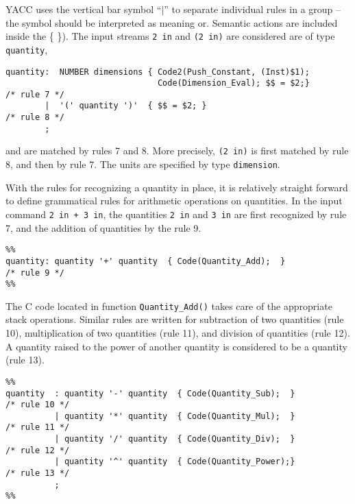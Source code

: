 \vspace{0.15 in}\noindent
YACC uses the vertical bar symbol ``$|$'' to
separate individual rules in a group -- the symbol
should be interpreted as meaning or.
Semantic actions are included inside the \{ \}).
The input streams {\tt 2 in} and {\tt (2 in)} are
considered are of type {\tt quantity},

\begin{footnotesize}
\begin{verbatim}
quantity:  NUMBER dimensions { Code2(Push_Constant, (Inst)$1);
                               Code(Dimension_Eval); $$ = $2;}        /* rule 7 */
        |  '(' quantity ')'  { $$ = $2; }                             /* rule 8 */
        ;
\end{verbatim}
\end{footnotesize}

\vspace{0.05 in}\noindent
and are matched by rules 7 and 8. More precisely, {\tt (2 in)} is
first matched by rule 8, and then by rule 7.
The units are specified by type {\tt dimension}.

\vspace{0.15 in}
\noindent\hspace{0.50 in}
With the rules for recognizing a quantity in place,
it is relatively straight forward to define grammatical
rules for arithmetic operations on quantities.
In the input command {\tt 2 in + 3 in},
the quantities {\tt 2 in} and {\tt 3 in} are first recognized by rule 7,
and the addition of quantities by the rule 9.

\begin{footnotesize}
\begin{verbatim}
%%
quantity: quantity '+' quantity  { Code(Quantity_Add);  }             /* rule 9 */
%%
\end{verbatim}
\end{footnotesize}

\vspace{0.15 in}\noindent
The C code located in function {\tt Quantity\_Add()} takes care of
the appropriate stack operations. Similar rules are written for
subtraction of two quantities (rule 10),
multiplication of two quantities (rule 11),
and division of quantities (rule 12).
A quantity raised to the power of another
quantity is considered to be a quantity (rule 13).

\begin{footnotesize}
\begin{verbatim}
%%
quantity  : quantity '-' quantity  { Code(Quantity_Sub);  }           /* rule 10 */
          | quantity '*' quantity  { Code(Quantity_Mul);  }           /* rule 11 */
          | quantity '/' quantity  { Code(Quantity_Div);  }           /* rule 12 */
          | quantity '^' quantity  { Code(Quantity_Power);}           /* rule 13 */
          ;
%%
\end{verbatim}
\end{footnotesize}

